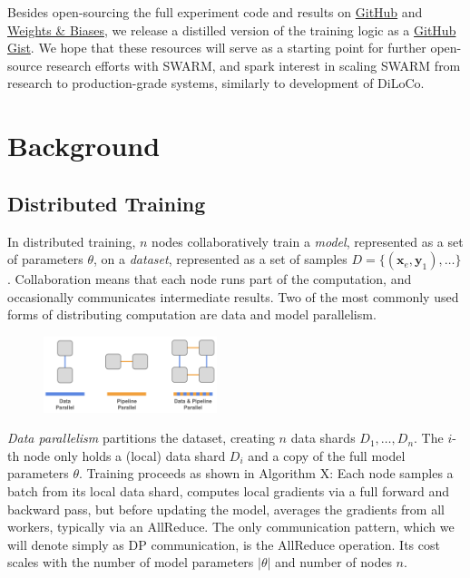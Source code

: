 \documentclass{article}
\newcommand{\github}{\href{https://github.com/mikasenghaas/swarm}{GitHub}}
\newcommand{\wandb}{\href{https://wandb.ai/mikasenghaas/swarm}{Weights \& Biases}}
\newcommand{\gist}{\href{https://gist.github.com/mikasenghaas/5fa1aa77ea69f187f531a5889983c249}{GitHub Gist}}
\begin{document}
Besides open-sourcing the full experiment code and results on \github{} and
\wandb{}, we release a distilled version of the training logic as a \gist{}. We
hope that these resources will serve as a starting point for further open-source
research efforts with SWARM, and spark interest in scaling SWARM from research to
production-grade systems, similarly to development of DiLoCo.

\section{Background}

\subsection{Distributed Training}

In distributed training, $n$ nodes collaboratively train a \textit{model},
represented as a set of parameters $\theta$, on a \textit{dataset}, represented
as a set of samples $D = \{(\mathbf{x}_e, \mathbf{y}_1),\dots\}$. Collaboration 
means that each node runs part of the computation, and occasionally communicates
intermediate results. Two of the most commonly used forms of distributing
computation are data and model parallelism.

\begin{figure}[h]
    \centering
    \includegraphics[width=0.45\textwidth]{figures/parallelization.png}
    \caption{}
    \label{fig:parallelization}
\end{figure}

\textit{Data parallelism} partitions the dataset, creating $n$ data shards
$D_1,\dots,D_n$. The $i$-th node only holds a (local) data shard $D_i$ and a
copy of the full model parameters $\theta$. Training proceeds as shown in
Algorithm X: Each node samples a batch from its local data shard,
computes local gradients via a full forward and backward pass, but before
updating the model, averages the gradients from all workers, typically via an
AllReduce. The only communication pattern, which we will denote simply as DP
communication, is the AllReduce operation. Its cost scales with the number
of model parameters $|\theta|$ and number of nodes $n$.
\end{document}

